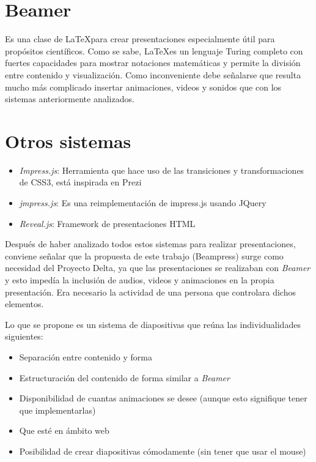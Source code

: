	\section{Beamer} %
	\label{sec:beamer}

		Es una clase de \LaTeX para crear presentaciones especialmente útil para propósitos científicos. Como se sabe, \LaTeX es un lenguaje Turing completo con fuertes capacidades para mostrar notaciones matemáticas y permite la división entre contenido y visualización. Como inconveniente debe señalarse que resulta mucho más complicado insertar animaciones, videos y sonidos que con los sistemas anteriormente analizados.	


	\section{Otros sistemas} %
	\label{sec:otros_sistemas}
		\begin{itemize}
			\item \textit{Impress.js}: Herramienta que hace uso de las transiciones y transformaciones de CSS3, está inspirada en Prezi
			\item \textit{jmpress.js}: Es una reimplementación de impress.js usando JQuery
			\item \textit{Reveal.js}: Framework de presentaciones HTML
		\end{itemize}

	Después de haber analizado todos estos sistemas para realizar presentaciones, conviene señalar que la propuesta de este trabajo (Beampress) surge como necesidad del Proyecto Delta, ya que las presentaciones se realizaban con \textit{Beamer} y esto impedía la inclusión de audios, videos y animaciones en la propia presentación. Era necesario la actividad de una persona que controlara dichos elementos. 

	Lo que se propone es un sistema de diapositivas que reúna las individualidades siguientes:

	\begin{itemize}
			\item Separación entre contenido y forma
			\item Estructuración del contenido de forma similar a \textit{Beamer}
			\item Disponibilidad de cuantas animaciones se desee (aunque esto signifique tener que implementarlas)
			\item Que esté en ámbito web
			\item Posibilidad de crear diapositivas cómodamente (sin tener que usar el mouse)
	\end{itemize}

